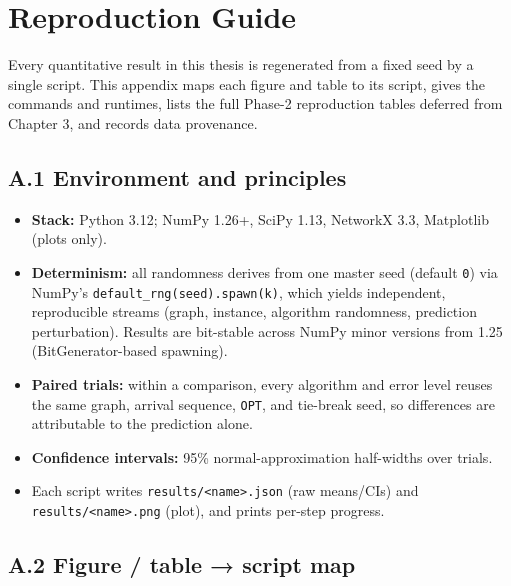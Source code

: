 \chapter{Reproduction Guide}\label{reproduction-guide}

Every quantitative result in this thesis is regenerated from a fixed seed by a single
script. This appendix maps each figure and table to its script, gives the commands and
runtimes, lists the full Phase-2 reproduction tables deferred from Chapter 3, and records
data provenance.

\section{A.1 Environment and principles}\label{a.1-environment-and-principles}

\begin{itemize}
\tightlist
\item
  \textbf{Stack:} Python 3.12; NumPy 1.26+, SciPy 1.13, NetworkX 3.3, Matplotlib (plots only).
\item
  \textbf{Determinism:} all randomness derives from one master seed (default \texttt{0}) via NumPy's
  \texttt{default\_rng(seed).spawn(k)}, which yields independent, reproducible streams (graph,
  instance, algorithm randomness, prediction perturbation). Results are bit-stable across
  NumPy minor versions from 1.25 (BitGenerator-based spawning).
\item
  \textbf{Paired trials:} within a comparison, every algorithm and error level reuses the same
  graph, arrival sequence, \texttt{OPT}, and tie-break seed, so differences are attributable to the
  prediction alone.
\item
  \textbf{Confidence intervals:} 95\% normal-approximation half-widths over trials.
\item
  Each script writes \texttt{results/\textless{}name\textgreater{}.json} (raw means/CIs) and \texttt{results/\textless{}name\textgreater{}.png} (plot),
  and prints per-step progress.
\end{itemize}

\section{A.2 Figure / table → script map}\label{a.2-figure-table-script-map}

